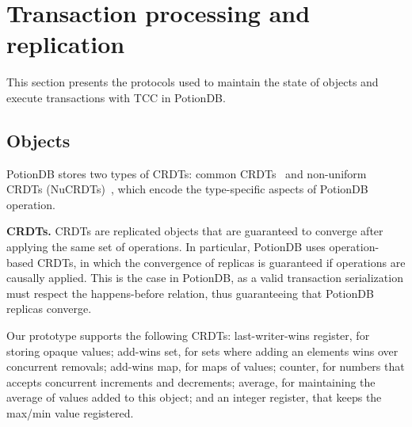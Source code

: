 \documentclass[sigplan,twocolumn,review,anonymous]{acmart}
\begin{document}



\section{Transaction processing and replication}
\label{sec:transactions}

This section presents the 
protocols used to maintain the state of objects
and execute transactions with TCC in PotionDB. 

\subsection{Objects}
\label{sec:tx:objs}

PotionDB stores two types of CRDTs: common CRDTs~\cite{crdt} and non-uniform CRDTs (NuCRDTs)~\cite{Cabrita17Nonuniform}, 
which encode the type-specific aspects of PotionDB operation.

\noindent
\textbf{CRDTs.} CRDTs are replicated objects that are guaranteed to converge
after applying the same set of operations. In particular, PotionDB uses operation-based CRDTs,
in which the convergence of replicas is guaranteed if operations are causally applied.
This is the case in PotionDB, as a valid transaction serialization must respect the happens-before
relation, thus guaranteeing that PotionDB replicas converge.

Our prototype supports the following CRDTs: last-writer-wins register, for storing opaque values;
add-wins set, for sets where adding an elements wins over concurrent removals;
add-wins map, for maps of values;
counter, for numbers that accepts concurrent increments and decrements;
average, for maintaining the average of values added to this object;
and an integer register, that keeps the max/min value registered. %
\end{document}
